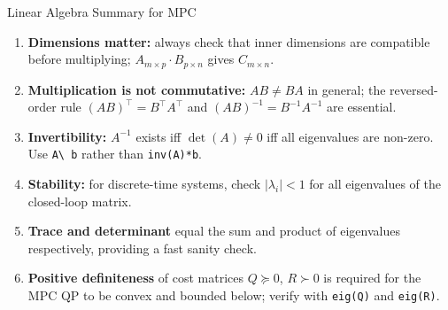 \begin{summarybox}{Linear Algebra Summary for MPC}
	\begin{enumerate}[noitemsep]
		\item \textbf{Dimensions matter:} always check that inner dimensions
		are compatible before multiplying; $A_{m\times p} \cdot
		B_{p\times n}$ gives $C_{m\times n}$.
		\item \textbf{Multiplication is not commutative:} $AB \neq BA$ in
		general; the reversed-order rule $(AB)^\top = B^\top A^\top$
		and $(AB)^{-1} = B^{-1}A^{-1}$ are essential.
		\item \textbf{Invertibility:} $A^{-1}$ exists iff $\det(A)\neq 0$
		iff all eigenvalues are non-zero.  Use \texttt{A\textbackslash
			b} rather than \texttt{inv(A)*b}.
		\item \textbf{Stability:} for discrete-time systems, check
		$|\lambda_i| < 1$ for all eigenvalues of the closed-loop
		matrix.
		\item \textbf{Trace and determinant} equal the sum and product of
		eigenvalues respectively, providing a fast sanity check.
		\item \textbf{Positive definiteness} of cost matrices $Q \succeq 0$,
		$R \succ 0$ is required for the MPC QP to be convex and
		bounded below; verify with \texttt{eig(Q)} and
		\texttt{eig(R)}.
	\end{enumerate}
\end{summarybox}